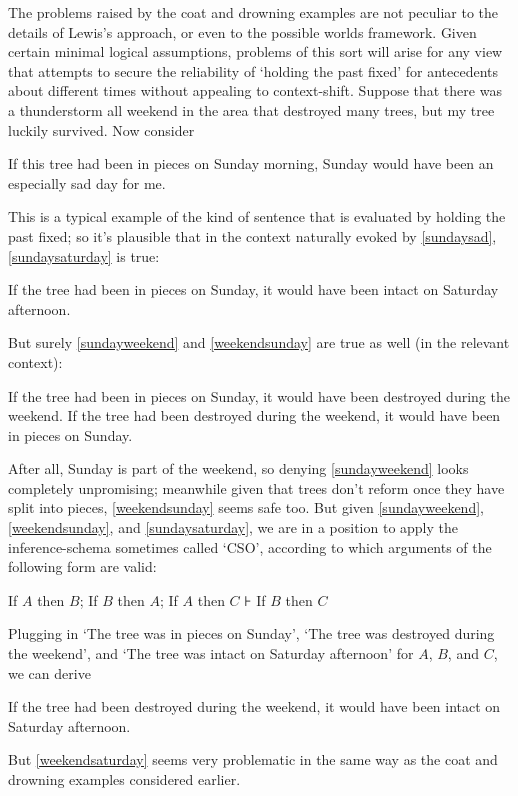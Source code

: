\documentclass[If.tex]{subfiles}
\begin{document}
\begin{prop}
The problems raised by the coat and drowning examples are not peculiar to the details of Lewis's approach, or even to the possible worlds framework. Given certain minimal logical assumptions, problems of this sort will arise for any view that attempts to secure the reliability of ‘holding the past fixed’ for antecedents about different times without appealing to context-shift. Suppose that there was a thunderstorm all weekend in the area that destroyed many trees, but my tree luckily survived. Now consider
\begin{prop}
	\nitem \label{sundaysad}
		If this tree had been in pieces on Sunday morning, Sunday would have been an especially sad day for me.
\end{prop}
This is a typical example of the kind of sentence that is evaluated by holding the past fixed; so it's plausible that in the context naturally evoked by \ref{sundaysad}, \ref{sundaysaturday} is true:
\begin{prop}
	\nitem \label{sundaysaturday}
		If the tree had been in pieces on Sunday, it would have been intact on Saturday afternoon.
\end{prop}
But surely \ref{sundayweekend} and \ref{weekendsunday} are true as well (in the relevant context):
\begin{prop}
	\nitem \label{sundayweekend}
		If the tree had been in pieces on Sunday, it would have been destroyed during the weekend.
	\nitem \label{weekendsunday}
		If the tree had been destroyed during the weekend, it would have been in pieces on Sunday.
\end{prop}
After all, Sunday is part of the weekend, so denying \ref{sundayweekend} looks completely unpromising; meanwhile given that trees don't reform once they have split into pieces, \ref{weekendsunday} seems safe too. But given \ref{sundayweekend}, \ref{weekendsunday}, and \ref{sundaysaturday}, we are in a position to apply the inference-schema sometimes called ‘CSO’, according to which arguments of the following form are valid:
\begin{prop}
	\sitem[CSO]
	If $A$ then $B$; If $B$ then $A$; If $A$ then $C$ ⊦ If $B$ then $C$
\end{prop}
Plugging in ‘The tree was in pieces on Sunday’, ‘The tree was destroyed during the weekend’, and ‘The tree was intact on Saturday afternoon’ for $A$, $B$, and $C$, we can derive
\begin{prop}
	\nitem \label{weekendsaturday}
		If the tree had been destroyed during the weekend, it would have been intact on Saturday afternoon.
\end{prop}
But \ref{weekendsaturday} seems very problematic in the same way as the coat and drowning examples considered earlier.


\end{prop}
\end{document}
